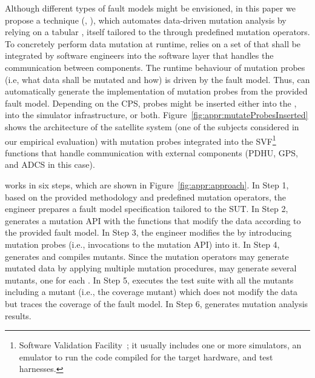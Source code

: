 Although different types of fault models might be envisioned,
in this paper we propose a technique (, \APPR),
which automates data-driven mutation analysis by relying on
a tabular , itself tailored to the  through predefined mutation operators.
To concretely perform data mutation at runtime, \APPR relies on a set of  that shall be integrated by software engineers into the software layer that handles the communication between components. The runtime behaviour of mutation probes (i.e, what data shall be mutated and how) is driven by the fault model. Thus, \APPR can automatically generate the implementation of mutation probes from the provided fault model.
Depending on the CPS, probes might be inserted either into the , into the simulator infrastructure, or both.
Figure~\ref{fig:appr:mutateProbesInserted} shows the architecture of the \ESAIL satellite system (one of the subjects considered in our empirical evaluation) with mutation probes integrated into the SVF\footnote{Software Validation Facility~\cite{Isasi2019}; it usually includes one or more simulators, an emulator to run the code compiled for the target hardware, and test harnesses.} functions that handle communication with external components (PDHU, GPS, and ADCS in this case).



\APPR works in six steps, which are shown in Figure~\ref{fig:appr:approach}.
In Step 1, based on the provided methodology and predefined mutation operators, the engineer prepares a fault model specification tailored to the SUT.
In Step 2, \APPR generates a mutation API with the functions that modify the data according to the provided fault model.
In Step 3, the engineer modifies the  by introducing mutation probes (i.e., invocations to the mutation API) into it.
In Step 4, \APPR generates and compiles mutants.
Since the \APPR mutation operators may generate mutated data by applying multiple mutation procedures, \APPR may generate several mutants, one for each .
In Step 5, \APPR executes the test suite with all the mutants including a mutant (i.e., the coverage mutant) which does not  modify the data but traces the coverage of the fault model.
In Step 6, \APPR generates mutation analysis results.

